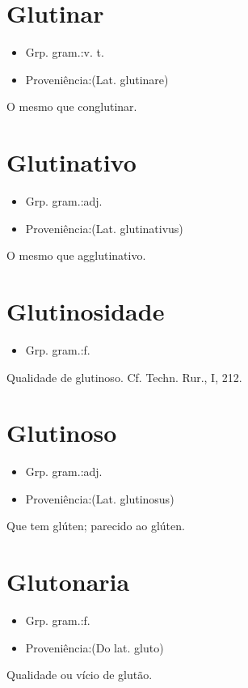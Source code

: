\section{Glutinar}
\begin{itemize}
\item {Grp. gram.:v. t.}
\end{itemize}
\begin{itemize}
\item {Proveniência:(Lat. \textunderscore glutinare\textunderscore )}
\end{itemize}
O mesmo que \textunderscore conglutinar\textunderscore .
\section{Glutinativo}
\begin{itemize}
\item {Grp. gram.:adj.}
\end{itemize}
\begin{itemize}
\item {Proveniência:(Lat. \textunderscore glutinativus\textunderscore )}
\end{itemize}
O mesmo que \textunderscore agglutinativo\textunderscore .
\section{Glutinosidade}
\begin{itemize}
\item {Grp. gram.:f.}
\end{itemize}
Qualidade de glutinoso. Cf. \textunderscore Techn. Rur.\textunderscore , I, 212.
\section{Glutinoso}
\begin{itemize}
\item {Grp. gram.:adj.}
\end{itemize}
\begin{itemize}
\item {Proveniência:(Lat. \textunderscore glutinosus\textunderscore )}
\end{itemize}
Que tem glúten; parecido ao glúten.
\section{Glutonaria}
\begin{itemize}
\item {Grp. gram.:f.}
\end{itemize}
\begin{itemize}
\item {Proveniência:(Do lat. \textunderscore gluto\textunderscore )}
\end{itemize}
Qualidade ou vício de glutão.

